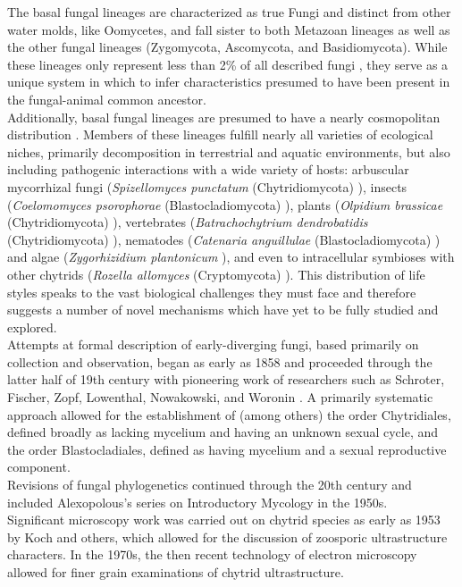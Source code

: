 \indent The basal fungal lineages are characterized as true Fungi and distinct from other water molds, like Oomycetes, and fall sister to both Metazoan lineages as well as the other fungal lineages (Zygomycota, Ascomycota, and Basidiomycota). While these lineages only represent less than 2\% of all described fungi \cite{Stajich2009}, they serve as a unique system in which to infer characteristics presumed to have been present in the fungal-animal common ancestor.\\
\indent Additionally, basal fungal lineages are presumed to have a nearly cosmopolitan distribution \cite{Powell1993}. Members of these lineages fulfill nearly all varieties of ecological niches, primarily decomposition in terrestrial and aquatic environments, but also including pathogenic interactions with a wide variety of hosts: arbuscular mycorrhizal fungi (\textit{Spizellomyces punctatum} (Chytridiomycota) \cite{Paulitz1984}), insects (\textit{Coelomomyces psorophorae} (Blastocladiomycota) \cite{Zebold1979}), plants (\textit{Olpidium brassicae} (Chytridiomycota) \cite{Tewari1983}), vertebrates (\textit{Batrachochytrium dendrobatidis} (Chytridiomycota) \cite{Longcore1999}), nematodes (\textit{Catenaria anguillulae} (Blastocladiomycota) \cite{Deacon1997}) and algae (\textit{Zygorhizidium plantonicum} \cite{Canter1967}), and even to intracellular symbioses with other chytrids (\textit{Rozella allomyces} (Cryptomycota) \cite{Held1973}). This distribution of life styles speaks to the vast biological challenges they must face and therefore suggests a number of novel mechanisms which have yet to be fully studied and explored. \\
\indent Attempts at formal description of early-diverging fungi, based primarily on collection and observation, began as early as 1858 and proceeded through the latter half of 19th century with pioneering work of researchers such as Schroter, Fischer, Zopf, Lowenthal, Nowakowski, and Woronin \cite{Phycomyces}. A primarily systematic approach allowed for the establishment of (among others) the order Chytridiales, defined broadly as lacking mycelium and having an unknown sexual cycle, and the order Blastocladiales, defined as having mycelium and a sexual reproductive component.\\
\indent Revisions of fungal phylogenetics continued through the 20th century and included Alexopolous's series on Introductory Mycology in the 1950s.\\
\indent Significant microscopy work was carried out on chytrid species as early as 1953 by Koch and others, which allowed for the discussion of zoosporic ultrastructure characters. In the 1970s, the then recent technology of electron microscopy allowed for finer grain examinations of chytrid ultrastructure.\\
